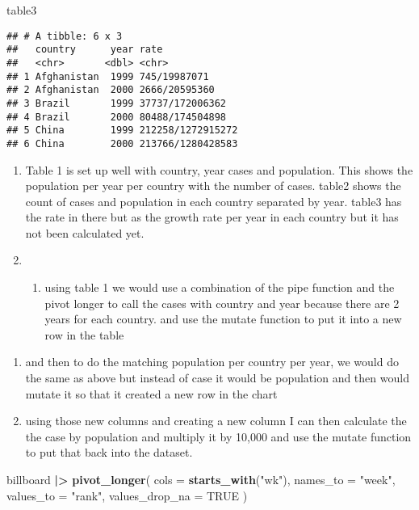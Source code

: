 \documentclass[
]{article}
\newenvironment{Shaded}{\begin{snugshade}}{\end{snugshade}}
\newcommand{\AttributeTok}[1]{\textcolor[rgb]{0.13,0.29,0.53}{#1}}
\newcommand{\ConstantTok}[1]{\textcolor[rgb]{0.56,0.35,0.01}{#1}}
\newcommand{\FunctionTok}[1]{\textcolor[rgb]{0.13,0.29,0.53}{\textbf{#1}}}
\newcommand{\NormalTok}[1]{#1}
\newcommand{\SpecialCharTok}[1]{\textcolor[rgb]{0.81,0.36,0.00}{\textbf{#1}}}
\newcommand{\StringTok}[1]{\textcolor[rgb]{0.31,0.60,0.02}{#1}}
\providecommand{\tightlist}{%
  \setlength{\itemsep}{0pt}\setlength{\parskip}{0pt}}
\begin{document}
\begin{Shaded}
\begin{Highlighting}[]
\NormalTok{table3}
\end{Highlighting}
\end{Shaded}

\begin{verbatim}
## # A tibble: 6 x 3
##   country      year rate             
##   <chr>       <dbl> <chr>            
## 1 Afghanistan  1999 745/19987071     
## 2 Afghanistan  2000 2666/20595360    
## 3 Brazil       1999 37737/172006362  
## 4 Brazil       2000 80488/174504898  
## 5 China        1999 212258/1272915272
## 6 China        2000 213766/1280428583
\end{verbatim}

\begin{enumerate}
\def\labelenumi{\arabic{enumi}.}
\tightlist
\item
  Table 1 is set up well with country, year cases and population. This
  shows the population per year per country with the number of cases.
  table2 shows the count of cases and population in each country
  separated by year. table3 has the rate in there but as the growth rate
  per year in each country but it has not been calculated yet.
\item
  \begin{enumerate}
  \def\labelenumii{\alph{enumii}.}
  \tightlist
  \item
    using table 1 we would use a combination of the pipe function and
    the pivot longer to call the cases with country and year because
    there are 2 years for each country. and use the mutate function to
    put it into a new row in the table
  \end{enumerate}
\end{enumerate}

\begin{enumerate}
\def\labelenumi{\alph{enumi}.}
\setcounter{enumi}{1}
\tightlist
\item
  and then to do the matching population per country per year, we would
  do the same as above but instead of case it would be population and
  then would mutate it so that it created a new row in the chart
\item
  using those new columns and creating a new column I can then calculate
  the the case by population and multiply it by 10,000 and use the
  mutate function to put that back into the dataset.
\end{enumerate}

\begin{Shaded}
\begin{Highlighting}[]
\NormalTok{billboard }\SpecialCharTok{|\textgreater{}}
  \FunctionTok{pivot\_longer}\NormalTok{(}
    \AttributeTok{cols =} \FunctionTok{starts\_with}\NormalTok{(}\StringTok{"wk"}\NormalTok{),}
    \AttributeTok{names\_to =} \StringTok{"week"}\NormalTok{,}
    \AttributeTok{values\_to =} \StringTok{"rank"}\NormalTok{,}
    \AttributeTok{values\_drop\_na =} \ConstantTok{TRUE}
\NormalTok{  )}
\end{Highlighting}
\end{Shaded}
\end{document}
